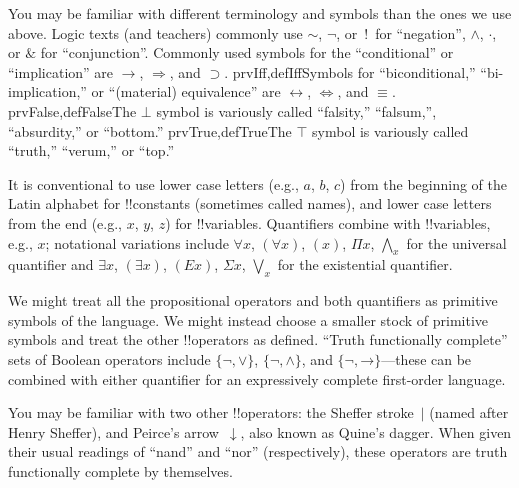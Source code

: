 \documentclass[10pt,a4paper]{article}
\theoremstyle{plain}
\theoremstyle{definition}
\theoremstyle{remark}
\newenvironment{explain}{}{}
\providecommand{\lif}{\mathbin{\rightarrow}}
\providecommand{\ltrue}{\top}
\providecommand{\lfalse}{\bot}
\providecommand{\iftag}[1]{#1}
\providecommand{\iftag}{}
\begin{document}
\begin{intro}
You may be familiar with different terminology and symbols than the
ones we use above. Logic texts (and teachers) commonly use 
$\sim$, $\neg$, or~!\ for ``negation'', $\wedge$, $\cdot$, or $\&$
for ``conjunction''.  Commonly used symbols for the ``conditional'' or
``implication'' are $\rightarrow$, $\Rightarrow$, and $\supset$.
\iftag{prvIff,defIff}{Symbols for ``biconditional,'' ``bi-implication,''
  or ``(material) equivalence'' are $\leftrightarrow$,
  $\Leftrightarrow$, and $\equiv$.}{}
\iftag{prvFalse,defFalse}{The $\lfalse$ symbol is variously called
  ``falsity,'' ``falsum,'', ``absurdity,'' or ``bottom.''}{}
\iftag{prvTrue,defTrue}{The $\ltrue$ symbol is variously called
  ``truth,'' ``verum,'' or ``top.''}{}

It is conventional to use lower case letters (e.g., $a$, $b$, $c$) from
the beginning of the Latin alphabet for !!{constant}s (sometimes called
names), and lower case letters from the end (e.g., $x$, $y$, $z$) for
!!{variable}s. Quantifiers combine with !!{variable}s, e.g., $x$;
notational variations include $\forall x$, $(\forall x)$, $(x)$, $\Pi x$,
$\bigwedge_x$ for the universal quantifier and $\exists x$, $(\exists
x)$, $(Ex)$, $\Sigma x$, $\bigvee_x$ for the existential quantifier.
\end{intro}

\begin{explain}
We might treat all the propositional operators and both quantifiers as
primitive symbols of the language.  We might instead choose a smaller
stock of primitive symbols and treat the other !!{operator}s as
defined. ``Truth functionally complete'' sets of Boolean operators
include $\{ \lnot, \lor \}$, $\{ \lnot, \land \}$, and $\{ \lnot,
\lif\}$---these can be combined with either quantifier for an
expressively complete first-order language.

You may be familiar with two other !!{operator}s: the Sheffer
stroke~$|$ (named after Henry Sheffer), and Peirce's
arrow~$\downarrow$, also known as Quine's dagger.  When given their
usual readings of ``nand'' and ``nor'' (respectively), these operators
are truth functionally complete by themselves.
\end{explain}


\end{document}
